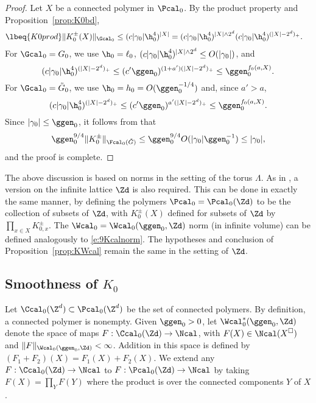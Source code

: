 \begin{proof}
Let $X$ be a connected polymer in $\Pcal_0$.
By the product property and Proposition~\ref{prop:K0bd},
\begin{align}
\lbeq{K0prod}
    \|K_0^\pm(X)\|_{\Gcal_0} \le (c|\gamma_0|\h_0^4)^{|X|}
    &=
    (c|\gamma_0|\h_0^4)^{|X|\wedge 2^d} (c|\gamma_0|\h_0^4)^{(|X|-2^d)_+}.
\end{align}
For $\Gcal_0=G_0$, we use $\h_0=\ell_0$,
$(c|\gamma_0|\h_0^4)^{|X|\wedge 2^d}\le O(|\gamma_0|)$, and
\begin{equation}
    (c|\gamma_0|\h_0^4)^{(|X|-2^d)_+} \le (c' \ggen_0)^{(1+a')(|X|-2^d)_+} \le \ggen_0^{f_0(a,X)}.
\end{equation}
For $\Gcal_0=\tilde G_0$, we use $\h_0=h_0 = O(\ggen_0^{-1/4})$ and, since $a'>a$,
\begin{equation}
    (c|\gamma_0|\h_0^4)^{(|X|-2^d)_+} \le (c' \ggen_0)^{a'(|X|-2^d)_+} \le \ggen_0^{f_0(a,X)}.
\end{equation}
Since $|\gamma_0| \le \ggen_0$, it follows from  that
\begin{equation}
    \ggen_0^{9/4}   \|K_0^\pm \|_{\Fcal_0(\tilde{G})}
    \le
    \ggen_0^{9/4}O(|\gamma_0| \ggen_0^{-1})
    \le |\gamma_0|,
\end{equation}
and the proof is complete.
\end{proof}

The above discussion is based on norms in the setting of the torus $\Lambda$.
As in \cite{BS-rg-step}, a version on the infinite lattice $\Zd$ is also required.
This can be done in exactly the same manner,
by defining
the polymers $\Pcal_0 = \Pcal_0(\Zd)$
to be the collection
of subsets of $\Zd$, with $K_0^\pm(X)$ defined for subsets of $\Zd$ by
$\prod_{x \in X} K_{0,x}^\pm$.
The $\Wcal_0 = \Wcal_0(\ggen_0, \Zd)$ norm (in infinite volume)
can be defined analogously to \eqref{e:9Kcalnorm}.
The hypotheses and conclusion of Proposition~\ref{prop:KWcal} remain the same
in the setting of $\Zd$.


\subsection{Smoothness of \texorpdfstring{$K_0$}{K0}}
\label{sec:Ksmooth}

Let $\Ccal_0(\Z^d) \subset \Pcal_0(\Z^d)$ be the set of connected polymers.
By definition, a connected polymer is nonempty.
Given $\ggen_0>0$, let
$\Wcal^*_0(\ggen_0, \Zd)$ denote the space of maps
$F :\Ccal_0(\Zd) \to \Ncal$,
with $F(X) \in \Ncal(X^\Box)$ and $\|F\|_{\Wcal_0(\ggen_0, \Zd)} < \infty$.
Addition in this space is defined by $(F_1+F_2)(X)=F_1(X)+F_2(X)$.
We extend any $F :\Ccal_0(\Zd) \to \Ncal$ to $F :\Pcal_0(\Zd) \to \Ncal$
by taking $F(X) = \prod_{Y} F(Y)$ where the product is over the connected components $Y$ of $X$.

